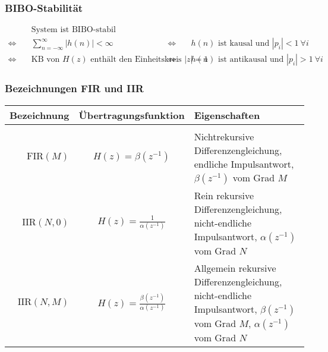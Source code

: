 \documentclass[10pt,a4paper]{article}
\begin{document}
\subsubsection*{BIBO-Stabilität}
\begin{align*}
	& \text{System ist BIBO-stabil} \\
	\Leftrightarrow \quad & \textstyle \sum_{n=-\infty}^\infty |h(n)| < \infty
	& \Leftrightarrow \quad & \text{$h(n)$ ist kausal und $|p_i| < 1 ~ \forall i$} \\
	\Leftrightarrow \quad & \text{KB von $H(z)$ enthält den Einheitskreis $|z| = 1$}
	& \Leftrightarrow \quad & \text{$h(n)$ ist antikausal und $|p_i| > 1 ~ \forall i$}
\end{align*}

\subsubsection*{Bezeichnungen FIR und IIR}
\begin{center}
	\begin{tabular}{r c p{8cm}}
		\textbf{Bezeichnung} & \textbf{Übertragungsfunktion} & \textbf{Eigenschaften} \\ \hline \\[-1.0em]
		$\mathrm{FIR}(M)$ & $H(z) = \beta \left(z^{-1} \right)$ & Nichtrekursive Differenzengleichung, endliche Impulsantwort, $\beta \left(z^{-1} \right)$ vom Grad $M$ \\
		$\mathrm{IIR}(N, 0)$ & $H(z) = \frac{1}{\alpha \left(z^{-1} \right)}$ & Rein rekursive Differenzengleichung, nicht-endliche Impulsantwort, $\alpha \left( z^{-1} \right)$ vom Grad $N$ \\
		$\mathrm{IIR}(N, M)$ & $H(z) = \frac{\beta \left(z^{-1} \right)}{\alpha \left(z^{-1} \right)}$ & Allgemein rekursive Differenzengleichung, nicht-endliche Impulsantwort, $\beta \left(z^{-1} \right)$ vom Grad $M$, $\alpha \left( z^{-1} \right)$ vom Grad $N$
	\end{tabular}
\end{center}
\end{document}

